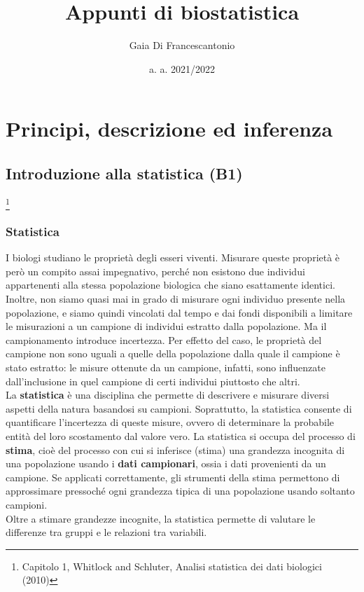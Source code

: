 \documentclass[drafts, 10pt]{book}
\title{\Huge{\textbf{Appunti di biostatistica}}}
\author{\Large{Gaia Di Francescantonio}}
\date{a. a. 2021/2022}
\begin{document}
\maketitle
\tableofcontents

\part{Principi, descrizione ed inferenza}

\chapter{Introduzione alla statistica (B1)} \footnote{Capitolo 1, Whitlock and Schluter, Analisi statistica dei dati biologici (2010)}


\section{Statistica}
I biologi studiano le proprietà degli esseri viventi. Misurare queste proprietà è però un compito assai impegnativo, perché non esistono due individui appartenenti alla stessa popolazione biologica che siano esattamente identici. Inoltre, non siamo quasi mai in grado di misurare ogni individuo presente nella popolazione, e siamo quindi vincolati dal tempo e dai fondi disponibili a limitare le misurazioni a un campione di individui estratto dalla popolazione. Ma il campionamento introduce incertezza. Per effetto del caso, le proprietà del campione non sono uguali a quelle della popolazione dalla quale il campione è stato estratto: le misure ottenute da un campione, infatti, sono influenzate dall'inclusione in quel campione di certi individui piuttosto che altri.
\\
La \textbf{statistica} è una disciplina che permette di descrivere e misurare diversi aspetti della natura basandosi su campioni. Soprattutto, la statistica consente di quantificare l'incertezza di queste misure, ovvero di determinare la probabile entità del loro scostamento dal valore vero. La statistica si occupa del processo di \textbf{stima}, cioè del processo con cui si inferisce (stima) una grandezza incognita di una popolazione usando i \textbf{dati campionari}, ossia i dati provenienti da un campione. Se applicati correttamente, gli strumenti della stima permettono di approssimare pressoché ogni grandezza tipica di una popolazione usando soltanto campioni.
\\
Oltre a stimare grandezze incognite, la statistica permette di valutare le differenze tra gruppi e le relazioni tra variabili.
\end{document}
